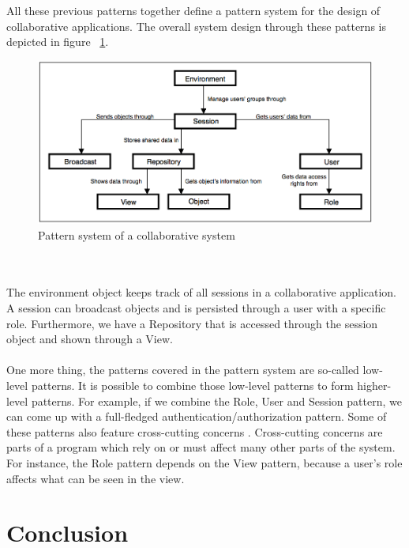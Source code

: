All these previous patterns together define a pattern system for the design of collaborative applications. The overall system design through these patterns is depicted in figure ~\ref{fig:pattern_system}.
\begin{figure}[h!]
\centering
\includegraphics[width=1.0\textwidth]{images/chap5_pattern_system.png}
\caption{Pattern system of a collaborative system}
\label{fig:pattern_system}
\end{figure} \\ \\
The environment object keeps track of all sessions in a collaborative application. A session can broadcast objects and is persisted through a user with a specific role. Furthermore, we have a Repository that is accessed through the session object and shown through a View. \\ \\
One more thing, the patterns covered in the pattern system are so-called low-level patterns. It is possible to combine those low-level patterns to form higher-level patterns. For example, if we combine the Role, User and Session pattern, we can come up with a full-fledged authentication/authorization pattern. Some of these patterns also feature cross-cutting concerns \cite{CrossCutting}. Cross-cutting concerns are parts of a program which rely on or must affect many other parts of the system. For instance, the Role pattern depends on the View pattern, because a user's role affects what can be seen in the view.

\section{Conclusion}

